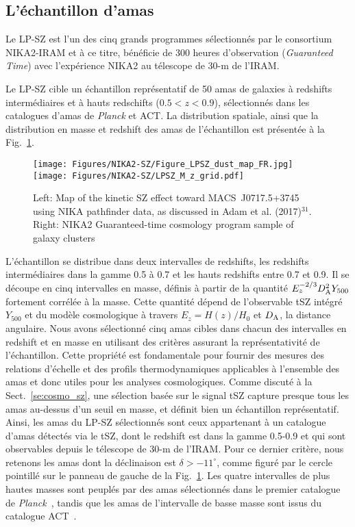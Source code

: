 \subsection{L'échantillon d'amas}
Le LP-SZ est l'un des cinq grands programmes sélectionnés par le
consortium NIKA2-IRAM et à ce titre, bénéficie de 300 heures
d'observation (\emph{Guaranteed Time}) avec l'expérience NIKA2 au
télescope de 30-m de l'IRAM.

Le LP-SZ cible un échantillon représentatif de 50 amas de galaxies à
redshifts intermédiaires et à hauts redschifts ($0.5 < z < 0.9$),
sélectionnés dans les catalogues d'amas de \emph{Planck} et ACT. La
distribution spatiale, ainsi que la distribution en masse et redshift
des amas de l'échantillon est présentée à la Fig.~\ref{fig:LP-SZ}.
%
\begin{figure}
  \centering
  \texttt{[image: Figures/NIKA2-SZ/Figure\_LPSZ\_dust\_map\_FR.jpg]}
  \hspace{4mm}
  \texttt{[image: Figures/NIKA2-SZ/LPSZ\_M\_z\_grid.pdf]}
  \caption{Left: Map of the kinetic SZ effect toward \mbox{MACS~J0717.5+3745} using NIKA pathfinder data, as discussed in Adam et al. (2017)$^{31}$. Right: NIKA2 Guaranteed-time cosmology program sample of galaxy clusters}
  \label{fig:LP-SZ}
\end{figure}
%
L'échantillon se distribue dans
deux intervalles de redshifts, les redshifts intermédiaires dans la
gamme 0.5 à 0.7 et les hauts redshifts entre 0.7 et 0.9. Il se découpe
en cinq intervalles en masse, définis à partir de la quantité
$E_{z}^{-2/3} D_{\rm{A}}^2 Y_{500}$ fortement corrélée à la masse. Cette
quantité dépend de l'observable tSZ intégré $Y_{500}$ et du modèle
cosmologique à travers $E_{z} = H(z)/H_0$ et $D_{\rm{A}}$, la distance
angulaire. Nous avons sélectionné cinq amas cibles dans chacun des
intervalles en redshift et en masse en utilisant des critères assurant
la représentativité de l'échantillon. Cette propriété est fondamentale
pour fournir des mesures des relations d'échelle et des profils
thermodynamiques applicables à l'ensemble des amas et donc utiles pour
les analyses cosmologiques. Comme discuté à la Sect.~\ref{se:cosmo_sz}, une
sélection basée sur le signal tSZ capture presque tous les amas
au-dessus d'un seuil en masse, et définit bien un échantillon
représentatif. Ainsi, les amas du LP-SZ sélectionnés sont ceux
appartenant à un catalogue d'amas détectés via le tSZ, dont le
redshift est dans la gamme 0.5-0.9 et qui sont observables depuis le
télescope de 30-m de l'IRAM. Pour ce dernier critère, nous retenons
les amas dont la déclinaison est $\delta > -11^{\circ}$, comme figuré
par le cercle pointillé sur le panneau de gauche de la
Fig.~\ref{fig:LP-SZ}. Les quatre intervalles de plus hautes masses sont
peuplés par des amas sélectionnés dans le premier catalogue de
\emph{Planck}~\citep[le seul disponible au moment de la définition de
l'échantillon][]{Planck2013_SZcat}, tandis que les amas de
l'intervalle de basse masse sont issus du catalogue
ACT~\citep{Hasselfield2013_ACT_SZ}.


